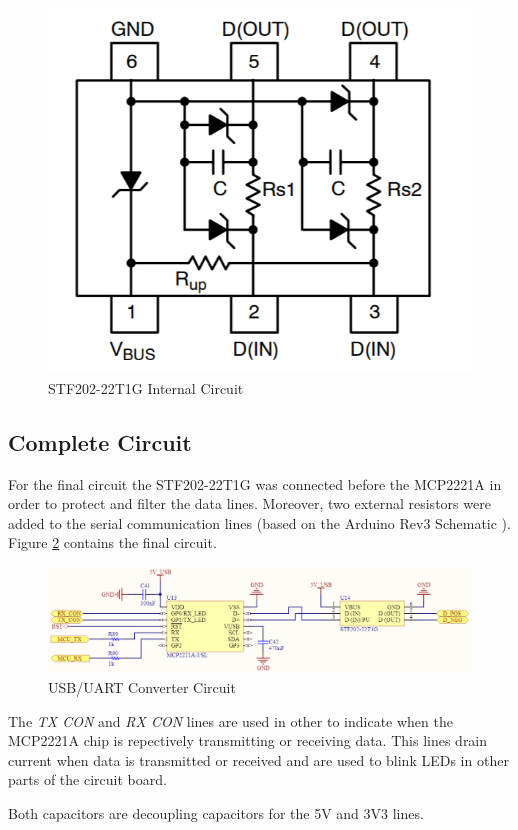 		\begin{figure}[htbp]
			\centering
				\includegraphics[scale=1.2]{figuras/fig-stf202-22t1g-sch}
			\caption{STF202-22T1G Internal Circuit \cite{stf202-22t1g-sch}}
			\label{fig:stf202-22t1g-sch}
		\end{figure}

	\subsection{Complete Circuit}\label{ssec:usb-uart-complete-circuit}

		For the final circuit the STF202-22T1G was connected before the MCP2221A in order to protect and filter the data lines. Moreover, two external resistors were added to the serial communication lines (based on the Arduino Rev3 Schematic \cite{arduino-rev3-schematic}). Figure \ref{fig:usb-uart-circuit} contains the final circuit.

		\begin{figure}[htbp]
			\centering
				\includegraphics[scale=0.5]{figuras/fig-usb-uart-circuit}
			\caption{USB/UART Converter Circuit \cite{usb-uart-circuit}}
			\label{fig:usb-uart-circuit}
		\end{figure}

		The \textit{TX CON} and \textit{RX CON} lines are used in other to indicate when the MCP2221A chip is repectively transmitting or receiving data. This lines drain current when data is transmitted or received and are used to blink LEDs in other parts of the circuit board. 

		Both capacitors are decoupling capacitors for the 5V and 3V3 lines. 